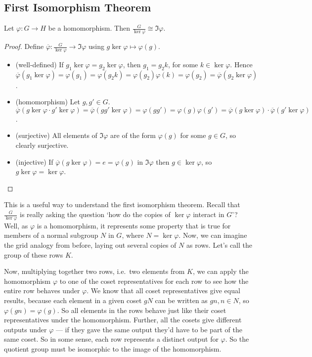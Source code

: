 \subsection{First Isomorphism Theorem}
\begin{theorem}
	Let \(\varphi: G \to H\) be a homomorphism.
	Then \(\frac{G}{\ker \varphi} \cong \Im \varphi\).
\end{theorem}
\begin{proof}
	Define \(\overline \varphi: \frac{G}{\ker \varphi} \to \Im \varphi\) using \(g \ker \varphi \mapsto \varphi(g)\).
	\begin{itemize}
		\item (well-defined) If \(g_1 \ker \varphi = g_2 \ker \varphi\), then \(g_1 = g_2k\), for some \(k \in \ker \varphi\).
		      Hence \(\overline\varphi(g_1 \ker \varphi) = \varphi(g_1) = \varphi(g_2k) = \varphi(g_2)\varphi(k) = \varphi(g_2) = \overline\varphi(g_2 \ker \varphi)\).
		\item (homomorphism) Let \(g, g' \in G\).
		      \(\overline\varphi(g \ker \varphi \cdot g' \ker \varphi) = \overline\varphi(gg' \ker \varphi) = \varphi(gg') = \varphi(g)\varphi(g') = \overline\varphi(g\ker\varphi) \cdot \overline\varphi(g'\ker\varphi)\).
		\item (surjective) All elements of \(\Im \varphi\) are of the form \(\varphi(g)\) for some \(g \in G\), so clearly surjective.
		\item (injective) If \(\overline\varphi(g \ker \varphi) = e = \varphi(g)\) in \(\Im \varphi\) then \(g \in \ker \varphi\), so \(g \ker \varphi = \ker \varphi\).
	\end{itemize}
\end{proof}
This is a useful way to understand the first isomorphism theorem.
Recall that \(\frac{G}{\ker \varphi}\) is really asking the question `how do the copies of \(\ker \varphi\) interact in \(G\)'?
Well, as \(\varphi\) is a homomorphism, it represents some property that is true for members of a normal subgroup \(N\) in \(G\), where \(N = \ker \varphi\).
Now, we can imagine the grid analogy from before, laying out several copies of \(N\) as rows.
Let's call the group of these rows \(K\).

Now, multiplying together two rows, i.e.\ two elements from \(K\), we can apply the homomorphism \(\varphi\) to one of the coset representatives for each row to see how the entire row behaves under \(\varphi\).
We know that all coset representatives give equal results, because each element in a given coset \(gN\) can be written as \(gn, n \in N\), so \(\varphi(gn) = \varphi(g)\).
So all elements in the rows behave just like their coset representatives under the homomorphism.
Further, all the cosets give different outputs under \(\varphi\) --- if they gave the same output they'd have to be part of the same coset.
So in some sense, each row represents a distinct output for \(\varphi\).
So the quotient group must be isomorphic to the image of the homomorphism.

